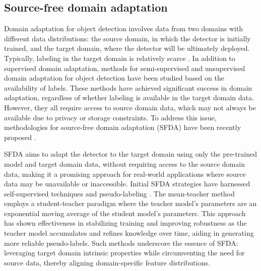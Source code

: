\subsection{Source-free domain adaptation} 
Domain adaptation for object detection involves data from two domains with different data distributions: the source domain, in which the detector is initially trained, and the target domain, where the detector will be ultimately deployed. Typically, labeling in the target domain is relatively scarce \cite{adp_vp}. In addition to supervised domain adaptation, methods for semi-supervised \cite{inoue2018cross, saito2019semi} and unsupervised domain adaptation \cite{chen2018domain, saito2019strong, cai2019exploring, vs2021mega} for object detection have been studied based on the availability of labels. These methods have achieved significant success in domain adaptation, regardless of whether labeling is available in the target domain data. However, they all require access to source domain data, which may not always be available due to privacy or storage constraints. To address this issue, methodologies for source-free domain adaptation (SFDA) have been recently proposed \cite{liang2020we, tarvainen2017mean, kundu2020universal, yang2021generalized, liu2021source, yang2022attracting, xu2022source}. 

SFDA aims to adapt the detector to the target domain using only the pre-trained model and target domain data, without requiring access to the source domain data, making it a promising approach for real-world applications where source data may be unavailable or inaccessible. Initial SFDA strategies have harnessed self-supervised techniques and pseudo-labeling \cite{liang2020we}. The mean-teacher method \cite{tarvainen2017mean} employs a student-teacher paradigm where the teacher model's parameters are an exponential moving average of the student model's parameters. This approach has shown effectiveness in stabilizing training and improving robustness as the teacher model accumulates and refines knowledge over time, aiding in generating more reliable pseudo-labels. Such methods underscore the essence of SFDA: leveraging target domain intrinsic properties while circumventing the need for source data, thereby aligning domain-specific feature distributions.

